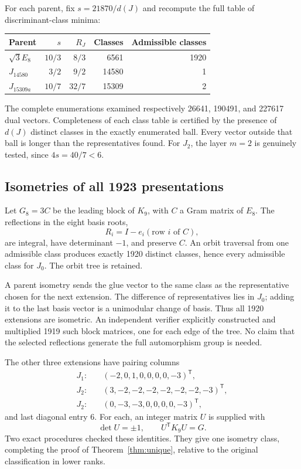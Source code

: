\documentclass[11pt,a4paper]{article}
\theoremstyle{remark}\newtheorem{remark}[theorem]{Remark}
\begin{document}
For each parent, fix $s=21870/d(J)$ and recompute the full table of discriminant-class minima:
\begin{center}
\begin{tabular}{lrrrr}
\toprule
Parent &$s$&$R_J$&Classes&Admissible classes\\\midrule
$\sqrt3E_8$ &$10/3$&$8/3$&6561&1920\\
$J_{14580}$ &$3/2$&$9/2$&14580&1\\
$J_{15309a}$ &$10/7$&$32/7$&15309&2\\
\bottomrule
\end{tabular}
\end{center}
The complete enumerations examined respectively 26641, 190491, and 227617 dual vectors. Completeness of each class table is certified by the presence of $d(J)$ distinct classes in the exactly enumerated ball. Every vector outside that ball is longer than the representatives found. For $J_2$, the layer $m=2$ is genuinely tested, since $4s=40/7<6$.

\subsection{Isometries of all 1923 presentations}

Let $G_8=3C$ be the leading block of $K_9$, with $C$ a Gram matrix of $E_8$. The reflections in the eight basis roots,
\[
R_i=I-e_i(\text{row }i\text{ of }C),
\]
are integral, have determinant $-1$, and preserve $C$. An orbit traversal from one admissible class produces exactly 1920 distinct classes, hence every admissible class for $J_0$. The orbit tree is retained.

A parent isometry sends the glue vector to the same class as the representative chosen for the next extension. The difference of representatives lies in $J_0$; adding it to the last basis vector is a unimodular change of basis. Thus all 1920 extensions are isometric. An independent verifier explicitly constructed and multiplied 1919 such block matrices, one for each edge of the tree. No claim that the selected reflections generate the full automorphism group is needed.

The other three extensions have pairing columns
\begin{align*}
J_1:&\quad(-2,0,1,0,0,0,0,-3)^{\mathsf T},\\
J_2:&\quad(3,-2,-2,-2,-2,-2,-2,-3)^{\mathsf T},\\
J_2:&\quad(0,-3,-3,0,0,0,0,-3)^{\mathsf T},
\end{align*}
and last diagonal entry 6. For each, an integer matrix $U$ is supplied with
\[
\det U=\pm1,\qquad U^{\mathsf T}K_9U=G.
\]
Two exact procedures checked these identities. They give one isometry class, completing the proof of Theorem~\ref{thm:unique}, relative to the original classification in lower ranks.
\end{document}
